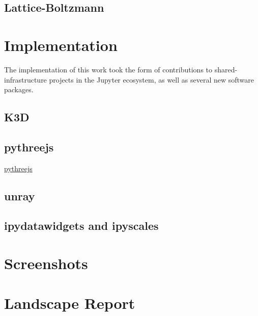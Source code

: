 \documentclass{deliverablereport}
\begin{document}
\subsection{Lattice-Boltzmann}



\section{Implementation}

The implementation of this work took the form of contributions to shared-infrastructure projects in the Jupyter ecosystem, as well as several new software packages.

\subsection{K3D}

\subsection{pythreejs}

\href{https://github.com/jupyter-widgets/pythreejs}{pythreejs}

\subsection{unray}

\subsection{ipydatawidgets and ipyscales}




\appendix
\section{Screenshots}\label{screenshots}
\newcommand{\screenshot}[2]{
\begin{figure}[ht]
  \texttt{[image: \#1]}
  \caption{#2}
\end{figure}}


\clearpage
\section{Landscape Report}\label{landscape}

\end{document}

